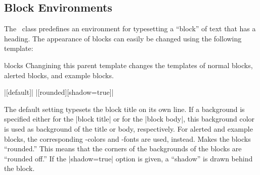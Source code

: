 \subsection{Block Environments}
\label{predefined}

The \beamer\ class predefines an environment for typesetting a
``block'' of text that has a heading. The appearance of blocks can
easily be changed using the following template:

\begin{element}{blocks}\semiyes\no\no
  Changining this parent template changes the templates of normal
  blocks, alerted blocks, and example blocks.

  \example |[default]|
  \example |[rounded][shadow=true]|

  \begin{templateoptions}
    The default setting typesets the block title on its own line. If a
    background is specified either for the |block title| or for the
    |block body|, this background color is used as background of the
    title or body, respectively. For alerted and example blocks, the
    corresponding \beamer-colors and -fonts are used, instead.
    Makes the blocks ``rounded.'' This means that the corners of the
    backgrounds of the blocks are ``rounded off.'' If the
    |shadow=true| option is given, a ``shadow'' is drawn behind the
    block.
  \end{templateoptions}
\end{element}


